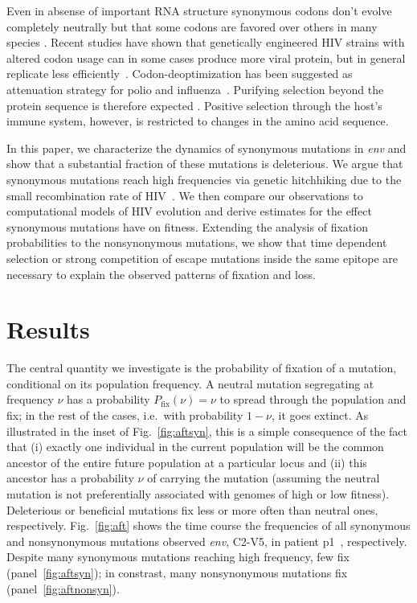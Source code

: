 \documentclass[rmp, twocolumn]{revtex4}
\newcommand{\FIG}[1]{Fig.~\ref{fig:#1}}
\newcommand{\env}{\textit{env}}
\begin{document}
Even in absense of important RNA structure synonymous codons don't
evolve completely neutrally but that some codons are favored over others in many
species \citep{plotkin_synonymous_2011}.
Recent studies have shown that genetically engineered HIV strains with
altered codon usage can in some cases produce more viral protein, but in general
replicate less efficiently~\citep{ngumbela_quantitative_2008,
li_codon-usage-based_2012,keating_rich_2009}.
Codon-deoptimization has been suggested as attenuation strategy for polio and 
influenza~\citep{mueller_live_2010,coleman_virus_2008}. Purifying
selection beyond the protein sequence is therefore expected
\citep{forsdyke_reciprocal_1995,snoeck_mapping_2011}. Positive
selection through the host's immune system, however, is restricted to
changes in the amino acid sequence.

In this paper, we characterize the dynamics of synonymous mutations in \env{}
and show that a substantial fraction of these mutations is deleterious.
We argue that synonymous mutations reach high frequencies via genetic hitchhiking
due to the small recombination rate of HIV~\citep{neher_recombination_2010,
batorsky_estimate_2011}.
We then
compare our observations to computational models of HIV evolution and derive
estimates for the effect synonymous mutations have on fitness.
Extending the analysis of fixation probabilities to the
nonsynonymous mutations, we show that time dependent selection or strong
competition of escape mutations inside the same epitope are necessary to explain
the observed patterns of fixation and loss.

\section{Results}
The central quantity we investigate is the probability of fixation of a
mutation, conditional on its population frequency.  A neutral mutation
segregating at frequency $\nu$ has a probability $P_\text{fix}(\nu) = \nu$ to
spread through the population and fix; in the rest of the cases, i.e.~with
probability $1-\nu$, it goes extinct. As illustrated in the inset of \FIG{aftsyn},
this is a simple consequence of the fact that
(i) exactly one individual in the current population will be
the common ancestor of the entire future population at a particular locus and
(ii) this ancestor has a probability $\nu$ of carrying the mutation (assuming
the neutral mutation is not preferentially associated with genomes of high or
low fitness).
Deleterious or beneficial mutations fix less or
more often than neutral ones, respectively. \FIG{aft} shows 
the time course the frequencies of all synonymous and nonsynonymous mutations
observed \env, C2-V5, in patient p1~\citep{shankarappa_consistent_1999},
respectively. Despite many synonymous mutations reaching high frequency, 
few fix (panel~\ref{fig:aftsyn}); in constrast, many nonsynonymous mutations fix
(panel~\ref{fig:aftnonsyn}).
\end{document}
